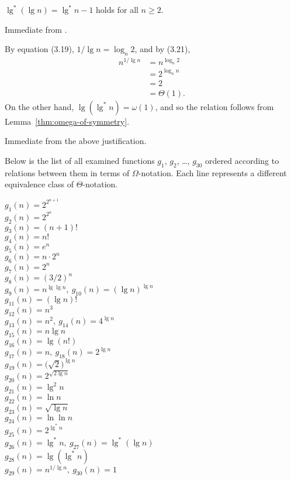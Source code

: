 \begin{description}[style=nextline]
    \item[$\lg^*n=\Theta(\lg^*(\lg n))$]
    $\lg^*(\lg n)=\lg^*n-1$ holds for all $n\ge2$.
    \item[$\lg^*(\lg n)=\omega(\lg(\lg^*n))$]
    Immediate from .
    \item[$\lg(\lg^*n)=\omega(n^{1/\!\lg n})$]
    By equation (3.19), $1/\lg n=\log_n2$, and by (3.21),
    \begin{align*}
        n^{1/\lg n} &= n^{\log_n2} \\
        &= 2^{\log_nn} \\
        &= 2\\
        &= \Theta(1).
    \end{align*}
    On the other hand, $\lg(\lg^*n)=\omega(1)$, and so the relation follows from Lemma~\ref{thm:omega-of-symmetry}.
    \item[$n^{1/\lg n}=\Theta(1)$]
    Immediate from the above justification.
\end{description}

Below is the list of all examined functions $g_1$, $g_2$, \dots, $g_{30}$ ordered according to relations between them in terms of $\Omega$-notation.
Each line represents a different equivalence class of $\Theta$-notation.
\begin{description}
    \item[$g_1(n)=2^{2^{n+1}}$]
    \item[$g_2(n)=2^{2^n}$]
    \item[$g_3(n)=(n+1)!$]
    \item[$g_4(n)=n!$]
    \item[$g_5(n)=e^n$]
    \item[$g_6(n)=n\cdot2^n$]
    \item[$g_7(n)=2^n$]
    \item[$g_8(n)=(3/2)^n$]
    \item[$g_9(n)=n^{\lg\lg n},\ g_{10}(n)=(\lg n)^{\lg n}$]
    \item[$g_{11}(n)=(\lg n)!$]
    \item[$g_{12}(n)=n^3$]
    \item[$g_{13}(n)=n^2,\ g_{14}(n)=4^{\lg n}$]
    \item[$g_{15}(n)=n\lg n$]
    \item[$g_{16}(n)=\lg(n!)$]
    \item[$g_{17}(n)=n,\ g_{18}(n)=2^{\lg n}$]
    \item[$g_{19}(n)=\bigl(\sqrt{2}\bigr)^{\lg n}$]
    \item[$g_{20}(n)=2^{\sqrt{2\lg n}}$]
    \item[$g_{21}(n)=\lg^2n$]
    \item[$g_{22}(n)=\ln n$]
    \item[$g_{23}(n)=\sqrt{\lg n}$]
    \item[$g_{24}(n)=\ln\ln n$]
    \item[$g_{25}(n)=2^{\lg^*n}$]
    \item[$g_{26}(n)=\lg^*n,\ g_{27}(n)=\lg^*(\lg n)$]
    \item[$g_{28}(n)=\lg(\lg^*n)$]
    \item[$g_{29}(n)=n^{1/\lg n},\ g_{30}(n)=1$]
\end{description}

